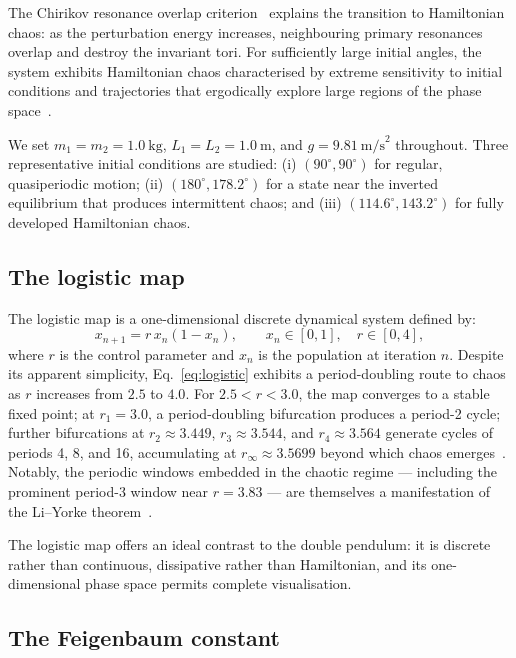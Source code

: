 \documentclass[aps,twocolumn,showpacs]{revtex4-2}
\begin{document}
The Chirikov resonance overlap criterion~\cite{Chirikov1979} explains the transition to Hamiltonian chaos: as the perturbation energy increases, neighbouring primary resonances overlap and destroy the invariant tori. For sufficiently large initial angles, the system exhibits Hamiltonian chaos characterised by extreme sensitivity
to initial conditions and trajectories that ergodically explore large regions of the phase
space~\cite{Shinbrot2005,Levien2013}.

We set $m_1 = m_2 = 1.0~\text{kg}$, $L_1 = L_2 = 1.0~\text{m}$, and $g = 9.81~\text{m/s}^2$ throughout.
Three representative initial conditions are studied: (i) $(90^\circ,90^\circ)$ for regular, quasiperiodic
motion; (ii) $(180^\circ,178.2^\circ)$ for a state near the inverted equilibrium that produces intermittent
chaos; and (iii) $(114.6^\circ,143.2^\circ)$ for fully developed Hamiltonian chaos.

\subsection{The logistic map}

The logistic map is a one-dimensional discrete dynamical system defined by:
\begin{equation}
x_{n+1} = r\, x_n (1 - x_n),\qquad
x_n \in [0,1],\quad r \in [0,4],
\label{eq:logistic}
\end{equation}
where $r$ is the control parameter and $x_n$ is the population at iteration $n$. Despite its apparent
simplicity, Eq.~\eqref{eq:logistic} exhibits a period-doubling route to chaos as $r$ increases from
$2.5$ to $4.0$. For $2.5 < r < 3.0$, the map converges to a stable fixed point; at $r_1 = 3.0$, a
period-doubling bifurcation produces a period-2 cycle; further bifurcations at $r_2 \approx 3.449$,
$r_3 \approx 3.544$, and $r_4 \approx 3.564$ generate cycles of periods 4, 8, and 16, accumulating at
$r_\infty \approx 3.5699$ beyond which chaos emerges~\cite{Feigenbaum1978,Ruette2017}. Notably, the periodic windows
embedded in the chaotic regime --- including the prominent period-3 window near $r=3.83$ --- are
themselves a manifestation of the Li--Yorke theorem~\cite{LiYorke1975}.

The logistic map offers an ideal contrast to the double pendulum: it is discrete rather than continuous,
dissipative rather than Hamiltonian, and its one-dimensional phase space permits complete visualisation.

\subsection{The Feigenbaum constant}
\end{document}
